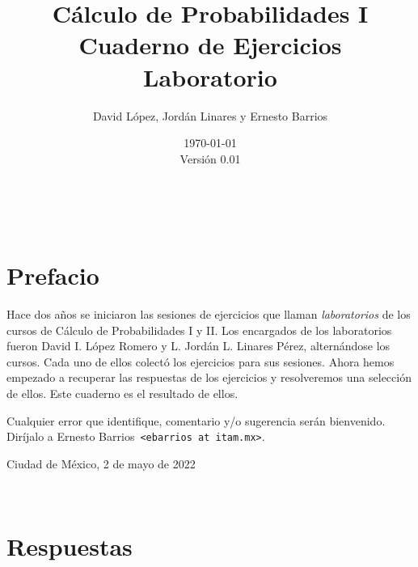\documentclass[11pt]{article}
\newcommand{\raiz}{../..}
\newcommand{\home}{\raiz/CP1/}
\def\version{0.01}
\begin{document}

\title{\bf {
		\huge Cálculo de Probabilidades I \\[1ex] 
		\LARGE Cuaderno de Ejercicios \\[1ex]
		\Large Laboratorio
		} }
\author{\large David López, Jordán Linares y Ernesto Barrios}
\date{\today \\[1ex] \small Versión \version}

\maketitle

\tableofcontents

\clearpage \newpage \

\section*{Prefacio}

Hace dos años se iniciaron las sesiones de ejercicios que llaman \emph{laboratorios} de los cursos de Cálculo de Probabilidades I y II. Los encargados de los laboratorios fueron David I. López Romero y L. Jordán L. Linares Pérez, alternándose los cursos. Cada uno de ellos colectó los ejercicios para sus sesiones. Ahora hemos empezado a recuperar las respuestas de los ejercicios y resolveremos una selección de ellos. Este cuaderno es el resultado de ellos.

\medskip

\noindent Cualquier error que identifique, comentario y/o sugerencia serán bienvenido. Diríjalo a Ernesto Barrios\ \texttt{<ebarrios at itam.mx>}.

\bigskip

\begin{flushright}Ciudad de México, 2 de mayo de 2022 \end{flushright}

\newpage 






\clearpage \newpage \

\renewcommand{\thesubsection}{\arabic{subsection}}
\section*{Respuestas}

\renewcommand{\theenumi}{\thesubsection:\arabic{enumi}}


\end{document}
